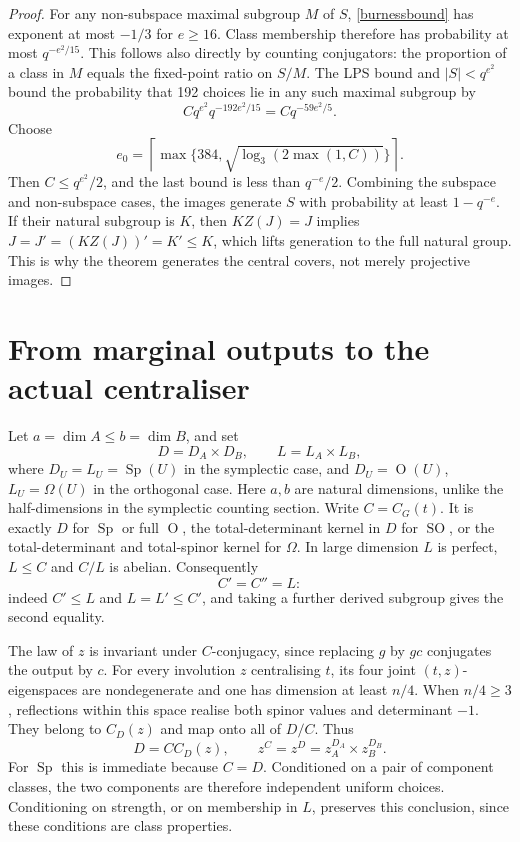 \documentclass[11pt]{article}
\newcommand{\Sp}{\operatorname{Sp}}
\newcommand{\Or}{\operatorname O}
\newcommand{\SO}{\operatorname{SO}}
\newcommand{\Om}{\Omega}
\begin{document}
\begin{proof}
For any non-subspace maximal subgroup $M$ of $S$, \eqref{burnessbound} has exponent at most $-1/3$ for $e\ge16$. Class membership therefore has probability at most $q^{-e^2/15}$. This follows also directly by counting conjugators: the proportion of a class in $M$ equals the fixed-point ratio on $S/M$. The LPS bound and $|S|<q^{e^2}$ bound the probability that 192 choices lie in any such maximal subgroup by
\[
Cq^{e^2}q^{-192e^2/15}=Cq^{-59e^2/5}.
\]
Choose
\[
e_0=\left\lceil\max\{384,\sqrt{\log_3(2\max(1,C))}\}\right\rceil.
\]
Then $C\le q^{e^2}/2$, and the last bound is less than $q^{-e}/2$. Combining the subspace and non-subspace cases, the images generate $S$ with probability at least $1-q^{-e}$. If their natural subgroup is $K$, then $KZ(J)=J$ implies $J=J'=(KZ(J))'=K'\le K$, which lifts generation to the full natural group. This is why the theorem generates the central covers, not merely projective images.
\end{proof}

\section{From marginal outputs to the actual centraliser}\label{bridge}
Let $a=\dim A\le b=\dim B$, and set
\[
D=D_A\times D_B,\qquad L=L_A\times L_B,
\]
where $D_U=L_U=\Sp(U)$ in the symplectic case, and $D_U=\Or(U)$, $L_U=\Om(U)$ in the orthogonal case. Here $a,b$ are natural dimensions, unlike the half-dimensions in the symplectic counting section. Write $C=C_G(t)$. It is exactly $D$ for $\Sp$ or full $\Or$, the total-determinant kernel in $D$ for $\SO$, or the total-determinant and total-spinor kernel for $\Om$. In large dimension $L$ is perfect, $L\le C$ and $C/L$ is abelian. Consequently
\begin{equation}\label{derived}
C'=C''=L:
\end{equation}
indeed $C'\le L$ and $L=L'\le C'$, and taking a further derived subgroup gives the second equality.

The law of $z$ is invariant under $C$-conjugacy, since replacing $g$ by $gc$ conjugates the output by $c$. For every involution $z$ centralising $t$, its four joint $(t,z)$-eigenspaces are nondegenerate and one has dimension at least $n/4$. When $n/4\ge3$, reflections within this space realise both spinor values and determinant $-1$. They belong to $C_D(z)$ and map onto all of $D/C$. Thus
\begin{equation}\label{productclass}
D=C C_D(z),\qquad z^C=z^D=z_A^{D_A}\times z_B^{D_B}.
\end{equation}
For $\Sp$ this is immediate because $C=D$. Conditioned on a pair of component classes, the two components are therefore independent uniform choices. Conditioning on strength, or on membership in $L$, preserves this conclusion, since these conditions are class properties.
\end{document}
